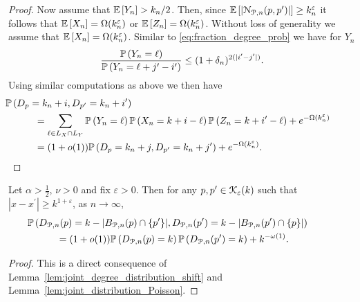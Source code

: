 \begin{appendices}
\begin{proof}
Now assume that $\mathbb{E}\left[Y_n\right] > k_n/2$. Then, since $\mathbb{E}\left[\left|{\mathcal N}_{{\mathcal P},n}(p,p^\prime)\right|\right] \ge k_n^{\varepsilon}$ it follows that $\mathbb{E}\left[X_n\right] = \Omega(k_n^\varepsilon)$ or $\mathbb{E}\left[Z_n\right] = \Omega(k_n^\varepsilon)$. Without loss of generality we assume that $\mathbb{E}\left[X_n\right] = \Omega(k_n^\varepsilon)$. Similar to \eqref{eq:fraction_degree_prob} we have for $Y_n$
\[
	\frac{\mathbb{P}\left(Y_n = \ell\right)}{\mathbb{P}\left(Y_n = \ell + j^\prime - i^\prime\right)} \le (1 + \delta_n)^{2(|i^\prime - j^\prime|)}.
\]
Using similar computations as above we then have
\begin{align*}
	&\hspace{-30pt}\Prob{D_p = k_n + i, D_{p^\prime} = k_n + i^\prime} \\
	&= \sum_{\ell \in L_X \cap L_Y} \Prob{Y_n = \ell} \Prob{X_n = k + i - \ell}
		\Prob{Z_n = k + i^\prime - \ell}  + e^{-\Omega(k_n^\varepsilon)}\\
	&= (1+o(1))\Prob{D_p = k_n + j, D_{p^\prime} = k_n + j^\prime} + e^{-\Omega(k_n^\varepsilon)}.
\end{align*}

\end{proof}


\begin{lemma}\label{lem:joint_degree_distribution_P_n}
Let $\alpha > \frac{1}{2}$, $\nu > 0$ and fix $\varepsilon > 0$. Then for any $p, p^\prime \in {\mathcal K}_{\varepsilon}(k)$ such that $|x - x^\prime| \ge k^{1 + \varepsilon}$, as $n \to \infty$,
\begin{align*}
	&\hspace{-30pt}\Prob{D_{\Pcal ,n}(p) = k - |B_{\Pcal,n}(p) \cap \{p^\prime\}|, 
		D_{\Pcal, n}(p^\prime) = k - |B_{\Pcal,n}(p^\prime) \cap \{p\}|}\\
	&= (1 + o(1)) \Prob{D_{\Pcal ,n}(p) = k} \Prob{D_{\Pcal ,n}(p^\prime) = k} + k^{-\omega(1)}.
\end{align*}
\end{lemma}

\begin{proof}
This is a direct consequence of Lemma~\ref{lem:joint_degree_distribution_shift} and Lemma~\ref{lem:joint_distribution_Poisson}.
\end{proof}




\end{appendices}
